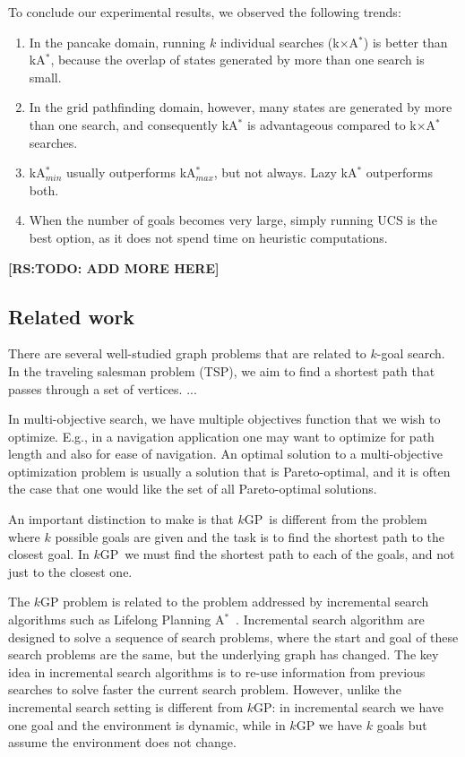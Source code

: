 \documentclass{aicom2e}
\newcommand{\kgs}{$k$GP}
\newcommand{\astar}{A$^*$}
\newcommand{\kastar}{kA$^*$}
\newcommand{\kastarmin}{kA$^*_{min}$}
\newcommand{\kastarmax}{kA$^*_{max}$}
\newcommand{\kxastar}{k$\times$A$^*$}
\newcommand{\roni}[1]{\textbf{[RS:#1]}}
\begin{document}
To conclude our experimental results, we observed the following trends:
\begin{enumerate}
    \item In the pancake domain, running $k$ individual searches (\kxastar{}) is better than \kastar{}, because the overlap of states generated by more than one search is small.
    \item In the grid pathfinding domain, however, many states are generated by more than one search, and consequently \kastar{} is advantageous compared to \kxastar{} searches.
    \item \kastarmin{} usually outperforms \kastarmax{}, but not always. Lazy \kastar{} outperforms both.
    \item When the number of goals becomes very large, simply running UCS is the best option, as it does not spend time on heuristic computations.
\end{enumerate}

\roni{TODO: ADD MORE HERE}




\subsection{Related work}
\label{sec:related-work}

There are several well-studied graph problems that are related to $k$-goal search. In the traveling salesman problem (TSP), we aim to find a shortest path that passes through a set of vertices.
...

In multi-objective search, we have multiple objectives function that we wish to optimize. E.g., in a navigation application one may want to optimize for path length and also for ease of navigation. An optimal
solution to a multi-objective optimization problem is usually a solution that is Pareto-optimal, and it is often the case that one would like the set of all Pareto-optimal solutions.


An important distinction to make is that \kgs\ is different from the problem where $k$ possible goals are given and the task is to find the shortest path to the closest goal. In \kgs\ we must find the shortest path to each of the goals, and not just to the closest one.


The \kgs{} problem is related to the problem addressed by incremental search algorithms such as Lifelong Planning \astar{}~\cite{koenig2004lifelong}. Incremental search algorithm are designed to solve a sequence of search problems, where the start and goal of these search problems are the same, but the underlying graph has changed. The key idea in incremental search algorithms is to re-use information from previous searches to solve faster the current search problem. However, unlike the incremental search setting is different from \kgs{}: in incremental search we have one goal and the environment is dynamic, while in \kgs{} we have $k$ goals but assume the environment does not change.
\end{document}
